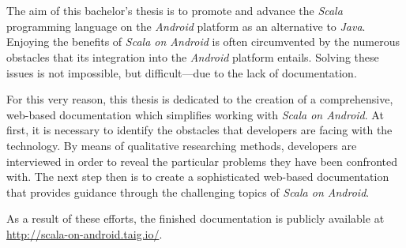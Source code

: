 \section*{}

The aim of this bachelor's thesis is to promote and advance the \textit{Scala} programming language on the \textit{Android} platform as an alternative to \textit{Java}. Enjoying the benefits of \textit{Scala on Android} is often circumvented by the numerous obstacles that its integration into the \textit{Android} platform entails. Solving these issues is not impossible, but difficult---due to the lack of documentation.

For this very reason, this thesis is dedicated to the creation of a comprehensive, web-based documentation which simplifies working with \textit{Scala on Android}. At first, it is necessary to identify the obstacles that developers are facing with the technology. By means of qualitative researching methods, developers are interviewed in order to reveal the particular problems they have been confronted with. The next step then is to create a sophisticated web-based documentation that provides guidance through the challenging topics of \textit{Scala on Android}.

As a result of these efforts, the finished documentation is publicly available at \url{http://scala-on-android.taig.io/}.